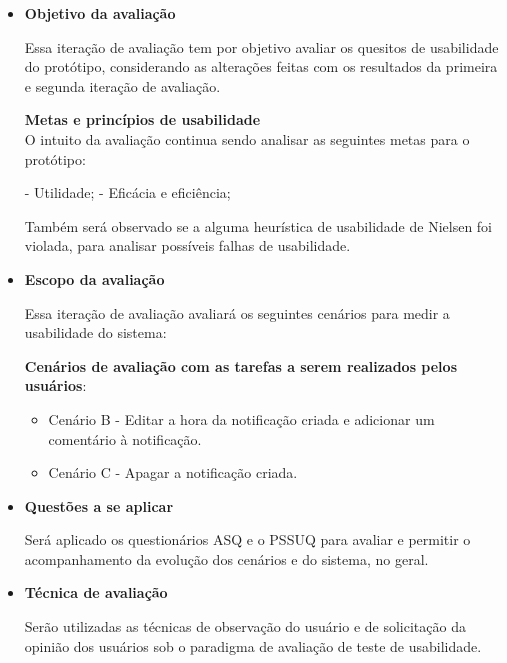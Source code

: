 	  \begin{itemize}
	   \item \textbf{Objetivo da avaliação}
	      
	      \subitem Essa iteração de avaliação tem por objetivo avaliar os quesitos de usabilidade do protótipo, considerando as
	      alterações feitas com os resultados da primeira e segunda iteração de avaliação.
	      
	      \subitem \textbf{Metas e princípios de usabilidade}\\
		O intuito da avaliação continua sendo analisar as seguintes metas para o protótipo:
		
		\subsubitem - Utilidade;
		\subsubitem - Eficácia e eficiência;
		
	      Também será observado se a alguma heurística de usabilidade de Nielsen foi violada, para analisar possíveis 
	      falhas de usabilidade.
	    
	   \item \textbf{Escopo da avaliação}
	      
	      \subitem Essa iteração de avaliação avaliará os seguintes cenários para medir a usabilidade do sistema:
	      
	      \subitem \textbf{Cenários de avaliação com as tarefas a serem realizados pelos usuários}:
		
		\begin{itemize}
		
		  \item Cenário B - Editar a hora da notificação criada e adicionar um comentário à notificação.
		    
		  \item Cenário C - Apagar a notificação criada.
		  
		\end{itemize}

	   \item \textbf{Questões a se aplicar}
	      
	      \subitem Será aplicado os questionários ASQ e o PSSUQ para avaliar e permitir o acompanhamento
		da evolução dos cenários e do sistema, no geral.
	      
	   \item \textbf{Técnica de avaliação}
	      
	      \subitem 
		Serão utilizadas as técnicas de observação do usuário e de solicitação da opinião dos usuários
		sob o paradigma de avaliação de teste de usabilidade.
	      

\end{itemize}

